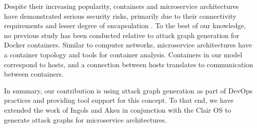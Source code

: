 Despite their increasing popularity, containers and microservice architectures have demonstrated serious security risks, primarily due to their connectivity requirements and lesser degree of encapsulation \cite{combe2016docker, dragoni2017microservices}. To the best of our knowledge, no previous study has been conducted relative to attack graph generation for Docker containers. Similar to computer networks, microservice architectures have a container topology and tools for container analysis. Containers in our model correspond to hosts, and a connection between hosts translates to communication between containers. 

In summary, our contribution is using attack graph generation as part of DevOps practices and providing tool support for this concept. To that end, we have extended the work of Ingols \cite{ingols2006practical} and Aksu \cite{aksu2018automated} in conjunction with the Clair OS to generate attack graphs for microservice architectures. 

